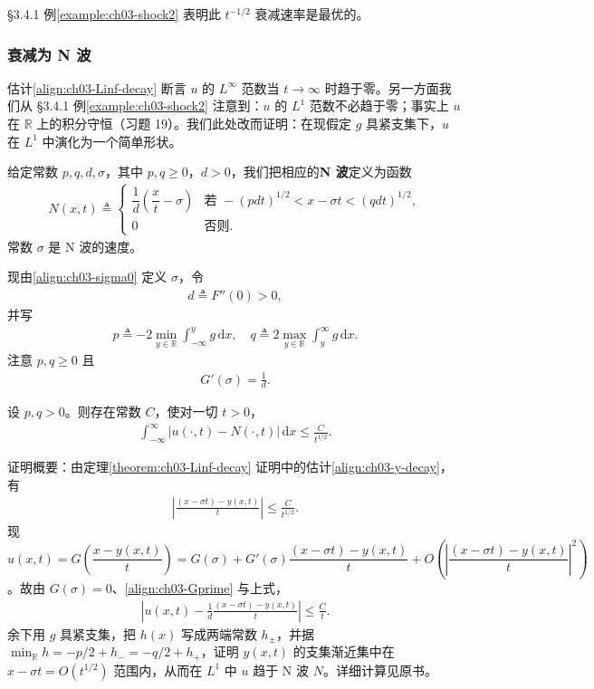 \documentclass[../../main.tex]{subfiles}
\begin{document}
\S3.4.1 例\cref{example:ch03-shock2} 表明此 $t^{-1/2}$ 衰减速率是最优的。

\subsubsection{衰减为 N 波}

估计\eqref{align:ch03-Linf-decay} 断言 $u$ 的 $L^\infty$ 范数当 $t\to\infty$ 时趋于零。另一方面我们从 \S3.4.1 例\cref{example:ch03-shock2} 注意到：$u$ 的 $L^1$ 范数不必趋于零；事实上 $u$ 在 $\mathbb{R}$ 上的积分守恒（习题 19）。我们此处改而证明：在现假定 $g$ 具紧支集下，$u$ 在 $L^1$ 中演化为一个简单形状。

给定常数 $p,q,d,\sigma$，其中 $p,q\geqslant 0$，$d>0$，我们把相应的\textbf{N 波}定义为函数
\begin{align}\label{align:ch03-Nwave}
N(x,t)\triangleq
\begin{cases}
\dfrac{1}{d}\left(\dfrac{x}{t}-\sigma\right) & \text{若 }-(pdt)^{1/2}<x-\sigma t<(qdt)^{1/2},\\
0 & \text{否则}.
\end{cases}
\end{align}
常数 $\sigma$ 是 N 波的速度。

现由\eqref{align:ch03-sigma0} 定义 $\sigma$，令
\begin{align}\label{align:ch03-d}
d\triangleq F''(0)>0,
\end{align}
并写
\begin{align}\label{align:ch03-pq}
p\triangleq-2\min_{y\in\mathbb{R}}\int_{-\infty}^y g\,\mathrm{d}x,\quad q\triangleq 2\max_{y\in\mathbb{R}}\int_y^\infty g\,\mathrm{d}x.
\end{align}
注意 $p,q\geqslant 0$ 且
\begin{align}\label{align:ch03-Gprime}
G'(\sigma)=\frac{1}{d}.
\end{align}

\begin{theorem}[$L^1$ 范数的渐近性]\label{theorem:ch03-L1-decay}设 $p,q>0$。则存在常数 $C$，使对一切 $t>0$，
\begin{align}\label{align:ch03-L1-decay}
\int_{-\infty}^{\infty}|u(\cdot,t)-N(\cdot,t)|\,\mathrm{d}x\leqslant\frac{C}{t^{1/2}}.
\end{align}
\end{theorem}

证明概要：由定理\cref{theorem:ch03-Linf-decay} 证明中的估计\eqref{align:ch03-y-decay}，有
\begin{align*}
\left|\frac{(x-\sigma t)-y(x,t)}{t}\right|\leqslant\frac{C}{t^{1/2}}.
\end{align*}
现 $u(x,t)=G\!\left(\dfrac{x-y(x,t)}{t}\right)=G(\sigma)+G'(\sigma)\dfrac{(x-\sigma t)-y(x,t)}{t}+O\!\left(\left|\dfrac{(x-\sigma t)-y(x,t)}{t}\right|^2\right)$。故由 $G(\sigma)=0$、\eqref{align:ch03-Gprime} 与上式，
\begin{align*}
\left|u(x,t)-\frac{1}{d}\frac{(x-\sigma t)-y(x,t)}{t}\right|\leqslant\frac{C}{t}.
\end{align*}
余下用 $g$ 具紧支集，把 $h(x)$ 写成两端常数 $h_\pm$，并据 $\min_\mathbb{R}h=-p/2+h_-=-q/2+h_+$，证明 $y(x,t)$ 的支集渐近集中在 $x-\sigma t=O(t^{1/2})$ 范围内，从而在 $L^1$ 中 $u$ 趋于 N 波 $N$。详细计算见原书。
\end{document}
